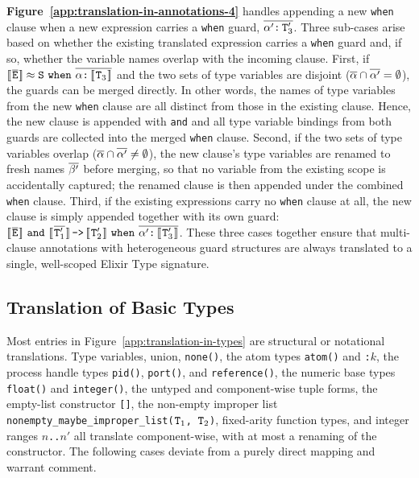 \textbf{Figure~\ref{app:translation-in-annotations-4}} handles appending a new \texttt{when} clause when a new expression carries a \texttt{when} guard, $\overline{\alpha^{\prime}\texttt{:\,}\texttt{T}_3^{\prime}}$.
Three sub-cases arise based on whether the existing translated expression carries a \texttt{when} guard and, if so, whether the variable names overlap with the incoming clause.
First, if $[\![\hspace{.07em}\overline{\texttt{E}}\hspace{.07em}]\!] \approx \texttt{S}\texttt{\,\,when\,\,}\overline{\alpha\texttt{:\,}[\![\hspace{.07em}\texttt{T}_3\hspace{.07em}]\!]}$ and the two sets of type variables are disjoint ($\overline{\alpha} \cap \overline{\alpha^{\prime}} = \emptyset$), the guards can be merged directly. 
In other words, the names of type variables from the new \texttt{when} clause are all distinct from those in the existing clause.
Hence, the new clause is appended with \texttt{and} and all type variable bindings from both guards are collected into the merged \texttt{when} clause.
Second, if the two sets of type variables overlap ($\overline{\alpha} \cap \overline{\alpha^{\prime}} \neq \emptyset$), the new clause's type variables are renamed to fresh names $\overline{\beta^{\prime}}$ before merging, so that no variable from the existing scope is accidentally captured; the renamed clause is then appended under the combined \texttt{when} clause.
Third, if the existing expressions carry no \texttt{when} clause at all, the new clause is simply appended together with its own guard: $\dsb{\ov{\TSE}}\texttt{\,\,and\,\,}\fun{\dsb{\ov{\prm{\ETT_1}}}}{\dsb{\prm{\ETT_2}}}\texttt{\,\,when\,\,}\ov{\prm{\alpha}\texttt{:\,}\dsb{\prm{\TST_3}}}$.
These three cases together ensure that multi-clause annotations with heterogeneous guard structures are always translated to a single, well-scoped Elixir Type signature.


\subsection{Translation of Basic Types}



Most entries in Figure~\ref{app:translation-in-types} are structural or notational translations.
Type variables, union, \texttt{none()}, the atom types \texttt{atom()} and \texttt{:$k$}, the process handle types \texttt{pid()}, \texttt{port()}, and \texttt{reference()}, the numeric base types \texttt{float()} and \texttt{integer()}, the untyped and component-wise tuple forms, the empty-list constructor \texttt{[]}, the non-empty improper list \texttt{nonempty\_maybe\_improper\_list($\texttt{T}_1$, $\texttt{T}_2$)}, fixed-arity function types, and integer ranges $n$\texttt{..}$n'$ all translate component-wise, with at most a renaming of the constructor.
The following cases deviate from a purely direct mapping and warrant comment.

